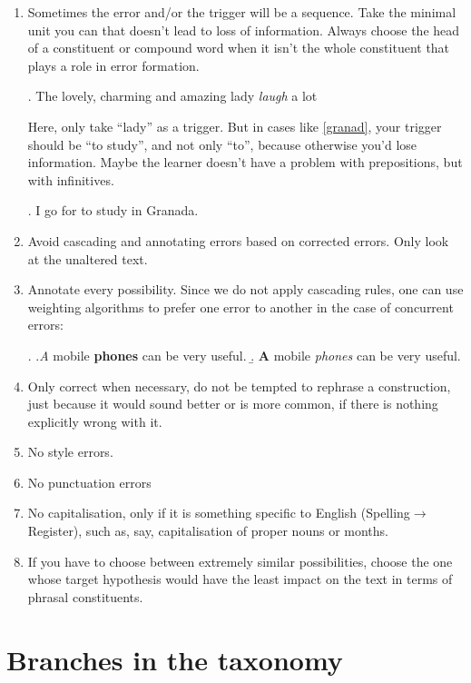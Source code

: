 \documentclass{article}
\begin{document}
\begin{enumerate}
\item Sometimes the error and/or the trigger will be a sequence. Take the
minimal unit you can that doesn't lead to loss of information. Always choose
the head of a constituent or compound word when it isn't the whole 
constituent that plays a role in error formation.

\ex.  The lovely, charming and amazing lady \textit{laugh} a lot 

Here, only take ``lady'' as a trigger. But in cases like \ref{granad}, your
trigger should be ``to study'', and not only ``to'', because otherwise you'd lose
information.  Maybe the learner doesn't have a problem with prepositions, but with infinitives.

\ex. I go for to study in Granada.\label{granad}

\item Avoid cascading and annotating errors based on corrected errors. Only look at the unaltered text.

\item Annotate every possibility. Since we do not apply cascading rules, one can use weighting algorithms to prefer one error to another in the case of concurrent errors:

\ex. \a.\textit{A} mobile \textbf{phones} can be very useful. 
\b. \textbf{A} mobile \textit{phones} can be very useful. 


\item Only correct when necessary, do not be tempted to rephrase a construction,
just because it would sound better or is more common, if there is nothing
explicitly wrong with it.

\item No style errors.

\item No punctuation errors

\item No capitalisation, only if it is something specific to English
(Spelling$\to$Register), such as, say, capitalisation of proper nouns or months.

\item If you have to choose between extremely similar possibilities, choose the
one whose target hypothesis would have the least impact on the text in terms of
phrasal constituents.

\end{enumerate}

\section{Branches in the taxonomy}\label{branches}
\end{document}
